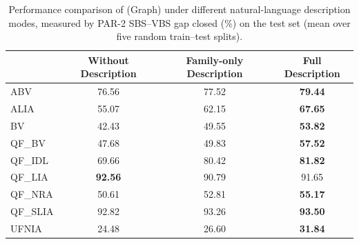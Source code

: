 \begin{table}[t]
\centering
\begin{tabular}{lccc}
\toprule
 & Without Description & Family-only Description & Full Description \\
\midrule
ABV & 76.56 & 77.52 & \textbf{79.44} \\
ALIA & 55.07 & 62.15 & \textbf{67.65} \\
BV & 42.43 & 49.55 & \textbf{53.82} \\
QF\_BV & 47.68 & 49.83 & \textbf{57.52} \\
QF\_IDL & 69.66 & 80.42 & \textbf{81.82} \\
QF\_LIA & \textbf{92.56} & 90.79 & 91.65 \\
QF\_NRA & 50.61 & 52.81 & \textbf{55.17} \\
QF\_SLIA & 92.82 & 93.26 & \textbf{93.50} \\
UFNIA & 24.48 & 26.60 & \textbf{31.84} \\
\bottomrule
\end{tabular}
\caption{Performance comparison of \smtselect{} (Graph) under different natural-language description modes, measured by PAR-2 SBS--VBS gap closed (\%) on the test set (mean over five random train--test splits).}
\label{tab:family_only_desc}
\end{table}
